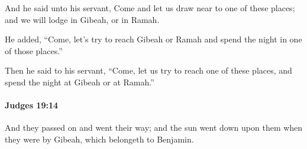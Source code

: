 			\begin{versebox}
					\item[BHS] 
					\item[ASV] And he said unto his servant, Come and let us draw near to one of these places; and we will lodge in Gibeah, or in Ramah.
					\item[NIV] He added, “Come, let’s try to reach Gibeah or Ramah and spend the night in one of those places.”
					\item[NRSV] Then he said to his servant, “Come, let us try to reach one of these places, and spend the night at Gibeah or at Ramah.”
			\end{versebox}

		\paragraph{Judges 19:14} %
			\label{JUDGES-19-14}

			And they passed on and went their way; and the sun went down upon them when they were by Gibeah, which belongeth to Benjamin.

